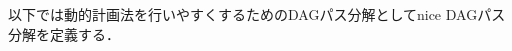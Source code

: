 \documentclass[master]{kuisthesis}		%
\theoremstyle{plain}
\theoremstyle{definition}
\begin{document}

以下では動的計画法を行いやすくするためのDAGパス分解としてnice DAGパス分解を定義する．
\end{document}
